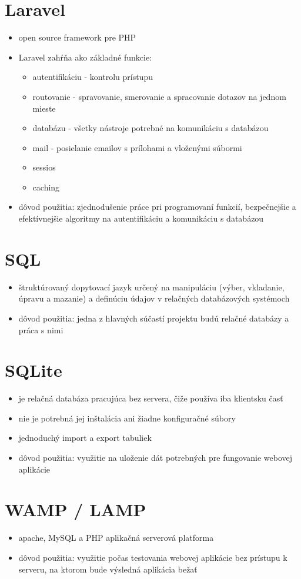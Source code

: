 \documentclass[12pt,a4paper]{report}
\theoremstyle{definition}
\theoremstyle{remark}
\begin{document}
\section{Laravel}
\begin{itemize}
\item open source framework pre PHP
\item Laravel zahŕňa ako základné funkcie:
	
	\begin{itemize}
	\item autentifikáciu - kontrolu prístupu
	\item routovanie - spravovanie, smerovanie a spracovanie dotazov na jednom mieste
	\item databázu - všetky nástroje potrebné na komunikáciu s databázou
	\item mail - posielanie emailov s prílohami a vloženými súbormi
	\item sessios
	\item caching 
	\end{itemize}

\item dôvod použitia: zjednodušenie práce pri programovaní funkcií, bezpečnejšie a efektívnejšie algoritmy na autentifikáciu a komunikáciu s databázou
\end{itemize}

\section{SQL}
\begin{itemize}
\item štruktúrovaný dopytovací jazyk určený na manipuláciu (výber, vkladanie, úpravu a mazanie) a definúciu údajov v relačných databázových systémoch
\item dôvod použitia: jedna z hlavných súčastí projektu budú relačné databázy a práca s nimi
\end{itemize}

\section{SQLite}
\begin{itemize}
\item je relačná databáza pracujúca bez servera, čiže používa iba klientsku časť
\item nie je potrebná jej inštalácia ani žiadne konfiguračné súbory
\item jednoduchý import a export tabuliek
\item dôvod použitia: využitie na uloženie dát potrebných pre fungovanie webovej aplikácie
\end{itemize}

\section{WAMP / LAMP}
\begin{itemize}
\item apache, MySQL a PHP aplikačná serverová platforma
\item dôvod použitia: využitie počas testovania webovej aplikácie bez prístupu k serveru, na ktorom bude výsledná aplikácia bežať
\end{itemize}
\end{document}
